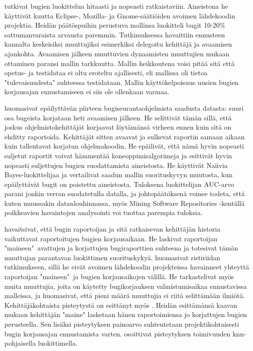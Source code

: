 \documentclass[utf8]{gradu3}
\begin{document}
\textcite{Giger-2010} tutkivat bugien luokittelua hitaasti ja nopeasti
ratkaistaviin. Aineistona he käyttivät kuutta Eclipse-, Mozilla- ja
Gnome-säätiöiden avoimen lähdekoodin projektia. Heidän päätöspuihin perustuva
mallinsa luokitteli bugit 10-20\% sattumanvaraista arvausta paremmin.
Tutkimuksessa havaittiin ennusteen kannalta keskeisiksi muuttujiksi esimerkiksi
delegoitu kehittäjä ja avaamisen ajankohta. Avaamisen jälkeen muuttuvien
dynaamisten muuttujien mukaan ottaminen paransi mallin tarkkuutta. Mallin
heikkoutena voisi pitää sitä että opetus- ja testidataa ei oltu eroteltu
ajallisesti, eli mallissa oli tietoa "tulevaisuudesta" suhteessa testidataan.
Mallin käyttökelpoisuus uusien bugien korjausajan ennustamiseen ei siis ole
ollenkaan varmaa.

\textcite{Lamkanfi-2012} huomasivat epäilyttävän piirteen bugiseurantaohjelmista
saadusta datasta: suuri osa bugeista korjataan heti avaamisen jälkeen. He
selittivät tämän sillä, että joskus ohjelmistokehittäjät korjaavat löytämänsä
virheen ennen kuin sitä on ehditty raportoida. Kehittäjät sitten avaavat ja
sulkevat raportin samaan aikaan kuin tallentavat korjatun ohjelmakoodin. He
epäilivät, että nämä hyvin nopeasti suljetut raportit voivat hämmentää
koneoppimisalgorimeja ja esittivät hyvin nopeasti suljettujen bugien
suodattamista aineistosta. %
He käyttivät Naiivia Bayes-luokittelijaa ja vertailivat saadun mallin
suorituskyvyn muutosta, kun epäilyttävät bugit on poistettu aineistosta.
Tuloksena luokittelijan AUC-arvo parani jonkin verran suodatetulla datalla, ja
johtopäätöksenä voinee todeta, että kuten muussakin datanlouhinnassa, myös
Mining Software Repositories -kentällä poikkeavien havaintojen analysointi voi
tuottaa parempia tuloksia.
 

\textcite{Guo-2010} havaitsivat, että bugin raportoijan ja sitä ratkaisevan
kehittäjän  historia vaikuttavat raportoitujen bugien korjausaikaan. He laskivat
raportoijan "maineen"\ avattujen ja korjattujen bugiraporttien suhteena ja
totesivat tämän muuttujan parantavan luokittimen suorituskykyä.%
\textcite{Bhattacharya-2011} huomasivat ristiriidan \parencite{Guo-2010}
tutkimukseen, sillä he eivät avoimen lähdekoodin projekteissa havainneet
yhteyttä raportoijan "maineen"\ ja bugien korjausaikojen välillä. He
tarkastelivat myös muita muuttujia, joita on käytetty bugikorjauksen
valmistumisaikaa ennustavissa malleissa, ja huomasivat, että pieni määrä
muuttujia ei riitä selittämään ilmiötä. \parencite{Bhattacharya-2011}
Kehittäjäkohtaista pisteytystä on esittänyt myös \textcite{ramarao-2016}. Heidän
esittämänsä kaavan mukaan kehittäjän "maine" lasketaan hänen raportoimiensa jo
korjattujen bugien perusteella. Sen lisäksi pisteytyksen painoarvo suhteutetaan
projektikohtaisesti bugin korjausajan ennustamista varten.
\textcite{ramarao-2016} osoittivat pisteytyksen toimivuuden knn-pohjaisella
luokittimella.
\end{document}
